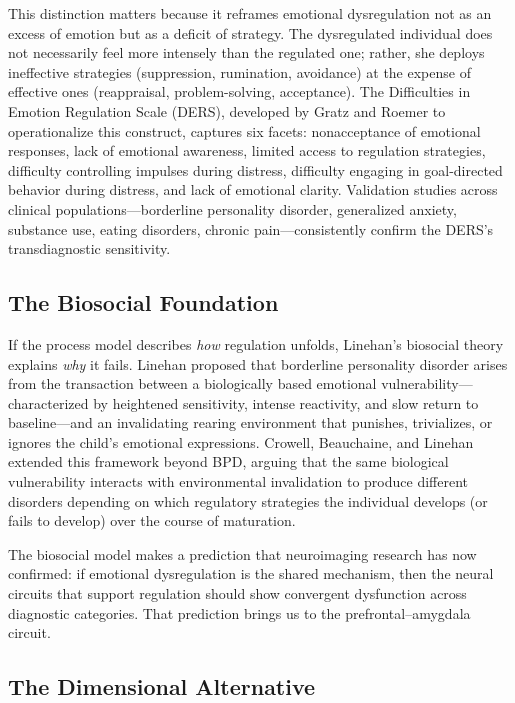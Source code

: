 This distinction matters because it reframes emotional dysregulation not as an
excess of emotion but as a deficit of strategy.  The dysregulated individual does
not necessarily feel more intensely than the regulated one; rather, she deploys
ineffective strategies (suppression, rumination, avoidance) at the expense of
effective ones (reappraisal, problem-solving, acceptance).  The Difficulties in
Emotion Regulation Scale (DERS), developed by Gratz and Roemer to operationalize
this construct, captures six facets: nonacceptance of emotional responses, lack
of emotional awareness, limited access to regulation strategies, difficulty
controlling impulses during distress, difficulty engaging in goal-directed
behavior during distress, and lack of emotional clarity.  Validation
studies across clinical populations---borderline personality disorder, generalized
anxiety, substance use, eating disorders, chronic pain---consistently confirm the
DERS's transdiagnostic sensitivity.

\subsection*{The Biosocial Foundation}

If the process model describes \textit{how} regulation unfolds, Linehan's
biosocial theory explains \textit{why} it fails.  Linehan proposed that
borderline personality disorder arises from the transaction between a
biologically based emotional vulnerability---characterized by heightened
sensitivity, intense reactivity, and slow return to baseline---and an
invalidating rearing environment that punishes, trivializes, or ignores the
child's emotional expressions.  Crowell, Beauchaine, and Linehan
extended this framework beyond BPD, arguing that the same biological
vulnerability interacts with environmental invalidation to produce different
disorders depending on which regulatory strategies the individual develops
(or fails to develop) over the course of maturation.

The biosocial model makes a prediction that neuroimaging research has now
confirmed: if emotional dysregulation is the shared mechanism, then the neural
circuits that support regulation should show convergent dysfunction across
diagnostic categories.  That prediction brings us to the prefrontal--amygdala
circuit.

\subsection*{The Dimensional Alternative}

